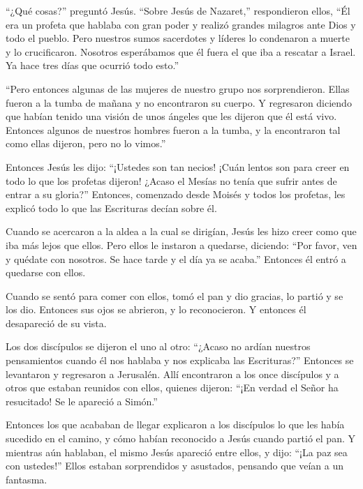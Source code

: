  ``¿Qué cosas?'' preguntó Jesús. ``Sobre Jesús de
Nazaret,'' respondieron ellos, ``Él era un profeta que hablaba con gran
poder y realizó grandes milagros ante Dios y todo el pueblo.
 Pero nuestros sumos sacerdotes y líderes lo condenaron a
muerte y lo crucificaron.  Nosotros esperábamos que él
fuera el que iba a rescatar a Israel. Ya hace tres días que ocurrió todo
esto.''

 ``Pero entonces algunas de las mujeres de nuestro grupo
nos sorprendieron.  Ellas fueron a la tumba de mañana y no
encontraron su cuerpo. Y regresaron diciendo que habían tenido una
visión de unos ángeles que les dijeron que él está vivo. 
Entonces algunos de nuestros hombres fueron a la tumba, y la encontraron
tal como ellas dijeron, pero no lo vimos.''

 Entonces Jesús les dijo: ``¡Ustedes son tan necios! ¡Cuán
lentos son para creer en todo lo que los profetas dijeron! 
¿Acaso el Mesías no tenía que sufrir antes de entrar a su gloria?''
 Entonces, comenzado desde Moisés y todos los profetas, les
explicó todo lo que las Escrituras decían sobre él.

 Cuando se acercaron a la aldea a la cual se dirigían,
Jesús les hizo creer como que iba más lejos que ellos. 
Pero ellos le instaron a quedarse, diciendo: ``Por favor, ven y quédate
con nosotros. Se hace tarde y el día ya se acaba.'' Entonces él entró a
quedarse con ellos.

 Cuando se sentó para comer con ellos, tomó el pan y dio
gracias, lo partió y se los dio.  Entonces sus ojos se
abrieron, y lo reconocieron. Y entonces él desapareció de su vista.

 Los dos discípulos se dijeron el uno al otro: ``¿Acaso no
ardían nuestros pensamientos cuando él nos hablaba y nos explicaba las
Escrituras?''  Entonces se levantaron y regresaron a
Jerusalén. Allí encontraron a los once discípulos y a otros que estaban
reunidos con ellos,  quienes dijeron: ``¡En verdad el Señor
ha resucitado! Se le apareció a Simón.''

 Entonces los que acababan de llegar explicaron a los
discípulos lo que les había sucedido en el camino, y cómo habían
reconocido a Jesús cuando partió el pan.  Y mientras aún
hablaban, el mismo Jesús apareció entre ellos, y dijo: ``¡La paz sea con
ustedes!''  Ellos estaban sorprendidos y asustados,
pensando que veían a un fantasma.

